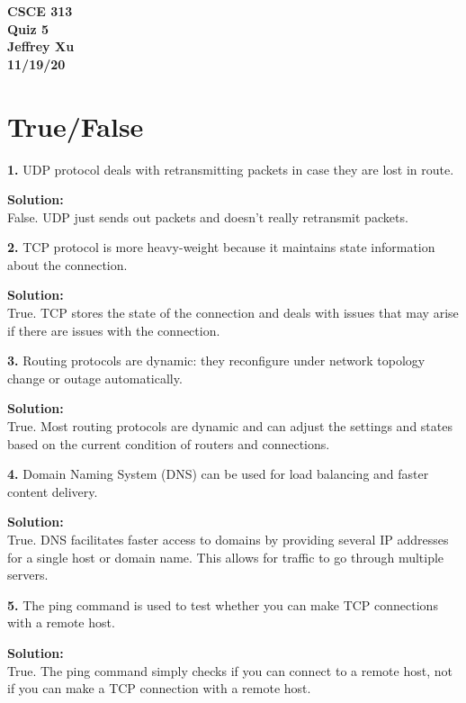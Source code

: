 \documentclass[12pt]{article}
\begin{document}
\begin{center}

{\bf
CSCE 313\\
Quiz 5\\
Jeffrey Xu\\
11/19/20\\
}

\end{center}

\section{True/False}

{\bf 1.} UDP protocol deals with retransmitting packets in case they are lost in route.

{\bf Solution:}\\

False. UDP just sends out packets and doesn't really retransmit packets. 

{\bf 2.} TCP protocol is more heavy-weight because it maintains state information about the connection.

{\bf Solution:}\\
True. TCP stores the state of the connection and deals with issues that may arise if there are issues with the connection. 

{\bf 3.} Routing protocols are dynamic: they reconfigure under network topology change or outage automatically.

{\bf Solution:}\\

True. Most routing protocols are dynamic and can adjust the settings and states based on the current condition of routers and connections. 

{\bf 4.} Domain Naming System (DNS) can be used for load balancing and faster content delivery.

{\bf Solution:}\\

True. DNS facilitates faster access to domains by providing several IP addresses for a single host or domain name. This allows for traffic to go through multiple servers. 

{\bf 5.} The ping command is used to test whether you can make TCP connections with a remote host.

{\bf Solution:}\\

True. The ping command simply checks if you can connect to a remote host, not if you can make a TCP connection with a remote host. 
\end{document}
